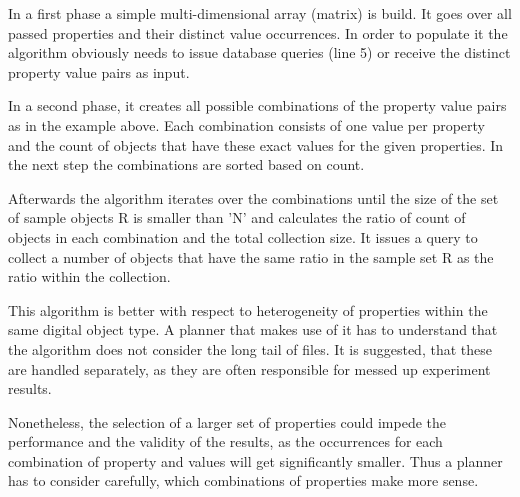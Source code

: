 In a first phase a simple multi-dimensional array (matrix) is build. It goes over all passed properties and their distinct value occurrences. In order to populate it the algorithm obviously needs to issue database queries (line 5) or receive the distinct property value pairs as input.

In a second phase, it creates all possible combinations of the property value pairs as in the example above. Each combination consists of one value per property and the count of objects that have these exact values for the given properties. In the next step the combinations are sorted based on count.

Afterwards the algorithm iterates over the combinations until the size of the set of sample objects R is smaller than 'N' and calculates the ratio of count of objects in each combination and the total collection size. It issues a query to collect a number of objects that have the same ratio in the sample set R as the ratio within the collection.

This algorithm is better with respect to heterogeneity of properties within the same digital object type. A planner that makes use of it has to understand that the algorithm does not consider the long tail of files. It is suggested, that these
are handled separately, as they are often responsible for messed up experiment results.

Nonetheless, the selection of a larger set of properties could impede the performance and the validity of the results, as the occurrences for each combination of property and values will get significantly smaller. Thus a planner has to consider carefully, which combinations of properties make more sense.

